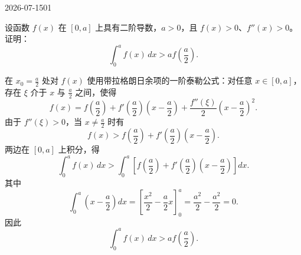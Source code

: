 \begin{mistake}{2026-07-15}{01}

\begin{problemcontent}
设函数 \(f(x)\) 在 \([0,a]\) 上具有二阶导数，\(a>0\)，且 \(f(x)>0\)、\(f''(x)>0\)。证明：
\[
\int_0^a f(x)\,dx>a f\left(\frac a2\right).
\]
\end{problemcontent}

\begin{solutioncontent}
在 \(x_0=\frac a2\) 处对 \(f(x)\) 使用带拉格朗日余项的一阶泰勒公式：对任意 \(x\in[0,a]\)，存在 \(\xi\) 介于 \(x\) 与 \(\frac a2\) 之间，使得
\[
f(x)=f\left(\frac a2\right)+f'\left(\frac a2\right)\left(x-\frac a2\right)+\frac{f''(\xi)}{2}\left(x-\frac a2\right)^2.
\]
由于 \(f''(\xi)>0\)，当 \(x\ne \frac a2\) 时有
\[
f(x)>f\left(\frac a2\right)+f'\left(\frac a2\right)\left(x-\frac a2\right).
\]
两边在 \([0,a]\) 上积分，得
\[
\int_0^a f(x)\,dx>
\int_0^a\left[f\left(\frac a2\right)+f'\left(\frac a2\right)\left(x-\frac a2\right)\right]dx.
\]
其中
\[
\int_0^a\left(x-\frac a2\right)dx
=\left[\frac{x^2}{2}-\frac a2x\right]_0^a
=\frac{a^2}{2}-\frac{a^2}{2}=0.
\]
因此
\[
\int_0^a f(x)\,dx>a f\left(\frac a2\right).
\]
\end{solutioncontent}


\end{mistake}

